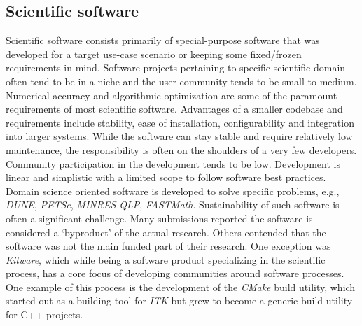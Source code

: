 \documentclass[11pt, oneside]{amsart}
\begin{document}
\subsection{Scientific software}
Scientific software consists primarily of special-purpose software that was
developed for a target use-case scenario or keeping some fixed/frozen
requirements in mind. Software projects pertaining to specific scientific
domain often tend to be in a niche and the user community tends to be small to
medium. Numerical accuracy and algorithmic optimization are some of the
paramount requirements of most scientific software. Advantages of a smaller
codebase and requirements include stability, ease of installation,
configurability and integration into larger systems. While the software can
stay stable and require relatively low maintenance, the responsibility is often
on the shoulders of a very few developers. Community participation in the
development tends to be low. Development is linear and simplistic with a
limited scope to follow software best practices. Domain science oriented
software is developed to solve  specific problems, e.g., \emph{DUNE},
\emph{PETSc}, \emph{MINRES-QLP}, \emph{FASTMath}. Sustainability of such
software is often a significant challenge. Many submissions reported the
software is considered a `byproduct' of the actual research.  Others contended
that the software was not the main funded part of their research. One exception
was \emph{Kitware}, which while being a software product specializing in the
scientific process, has a core focus of developing communities around software
processes. One example of this process is the development of the \emph{CMake}
build utility, which started out as a building tool for \emph{ITK} but grew to
become a generic build utility for C++ projects. 
\end{document}
